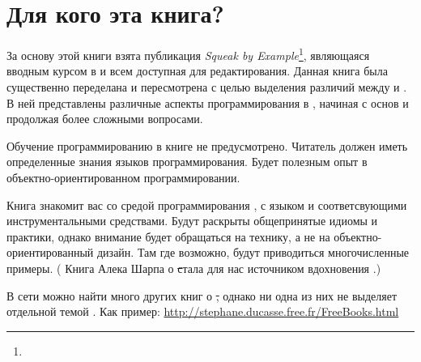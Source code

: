 \documentclass[a4paper,10pt,twoside]{book}
\begin{document}
\section*{Для кого эта книга?}


За основу этой книги взята публикация \emph{Squeak by Example}\footnote{\sbe}, являющаяся вводным курсом в \squeak и всем доступная для редактирования. Данная книга была существенно переделана и пересмотрена с целью выделения различий между \pharo и \squeak. В ней представлены различные аспекты программирования в \pharo, начиная с основ и продолжая более сложными вопросами.


Обучение программированию в книге не предусмотрено. Читатель должен иметь определенные знания языков программирования. Будет полезным опыт в объектно-ориентированном программировании.


Книга знакомит вас со средой программирования \pharo, с языком и соответсвующими инструментальными средствами. Будут раскрыты общепринятые идиомы и практики, однако внимание будет обращаться на технику, а не на объектно-ориентированный дизайн. Там где возможно, будут приводиться многочисленные примеры. ( Книга Алека Шарпа о \st стала для нас источником вдохновения \cite{Shar97a}.)


В сети можно найти много других книг о \st, однако ни одна из них не выделяет отдельной темой \pharo. Как пример:
\url{http://stephane.ducasse.free.fr/FreeBooks.html}
\end{document}
